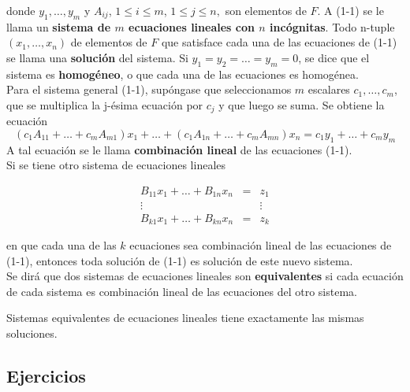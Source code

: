 donde $y_1,\ldots , y_{m}$ y $A_{ij}$, $1\leq i \leq m$, $1\leq j \leq n,$ son elementos de $F$. A (1-1) se le llama un \textbf{\boldmath sistema de $m$ ecuaciones lineales con $n$ incógnitas}. Todo n-tuple $(x_1,\ldots,x_n)$ de elementos de $F$ que satisface cada una de las ecuaciones de (1-1) se llama una \textbf{solución} del sistema. Si $y_1=y_2=\ldots = y_m=0$, se dice que el sistema es \textbf{homogéneo}, o que cada una de las ecuaciones es homogénea.\\

Para el sistema general (1-1), supóngase que seleccionamos $m$ escalares $c_1,\ldots, c_m$, que se multiplica la j-ésima ecuación por $c_j$ y que luego se suma. Se obtiene la ecuación
$$(c_1 A_{11}+\ldots +c_m A_{m1})x_1+\ldots+(c_1A_{1n}+\ldots + c_mA_{mn})x_n=c_1y_1+\ldots+c_my_m$$
A tal ecuación se le llama \textbf{combinación lineal} de las ecuaciones (1-1).\\ 

Si se tiene otro sistema de ecuaciones lineales

\begin{equation}
    \begin{array}{ccc}
	B_{11}x_1+\ldots + B_{1n}x_n&=&z_1\\
	\vdots &&\vdots\\
	B_{k1}x_1+\ldots + B_{kn}x_n&=&z_k
    \end{array}
\end{equation}

en que cada una de las $k$ ecuaciones sea combinación lineal de las ecuaciones de (1-1), entonces toda solución de (1-1) es solución de este nuevo sistema.\\ 

Se dirá que dos sistemas de ecuaciones lineales son \textbf{equivalentes} si cada ecuación de cada sistema es combinación lineal de las ecuaciones del otro sistema.\\

\begin{teo}
    Sistemas equivalentes de ecuaciones lineales tiene exactamente las mismas soluciones.
\end{teo}
\vspace{.5cm}

\subsection*{Ejercicios}

